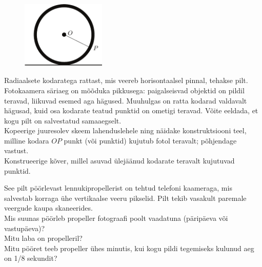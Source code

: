 \documentclass[10pt]{article}
\begin{document}
{
\begin{figure}
	\vspace{-10pt}
	\includegraphics[width=40mm]{2011-lahg-10-kodar.pdf}
\end{figure}
Radiaalsete kodaratega rattast, mis veereb horisontaalsel pinnal, tehakse pilt.
Fotokaamera säriaeg on mõõduka pikkusega: paigalseisvad objektid on pildil teravad, 
liikuvad esemed aga hägused. Muuhulgas on ratta kodarad valdavalt hägusad, 
kuid osa kodarate teatud punktid on ometigi teravad. Võite eeldada, et kogu pilt on 
salvestatud samaaegselt. 
\\
\osa Kopeerige juuresolev skeem lahenduslehele ning näidake konstruktsiooni teel, 
milline kodara $OP$ punkt (või punktid) kujutub fotol teravalt; põhjendage vastust.\\
\osa Konstrueerige kõver, millel asuvad ülejäänud kodarate teravalt kujutuvad punktid.
\probend
\newpage

\bigskip


See pilt pöörlevast lennukipropellerist on tehtud telefoni kaameraga, mis salvestab korraga ühe vertikaalse veeru pikselid. Pilt tekib vasakult paremale veergude kaupa skaneerides.\\
\osa Mis suunas pöörleb propeller fotograafi poolt vaadatuna (päripäeva või vastupäeva)?\\
\osa Mitu laba on propelleril?\\
\osa Mitu pööret teeb propeller ühes minutis, kui kogu pildi tegemiseks kulunud aeg on 1/8 sekundit?\\

}
\end{document}
